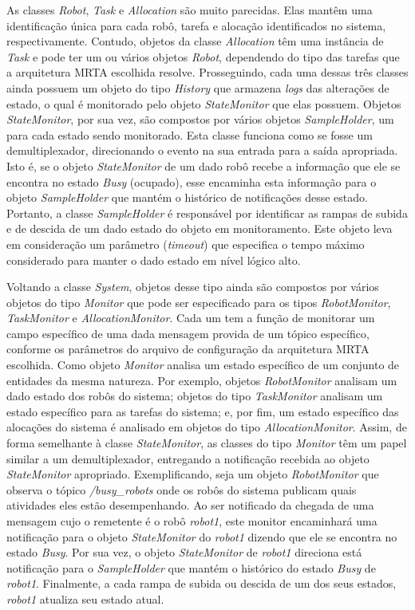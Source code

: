             As classes \textit{Robot}, \textit{Task} e \textit{Allocation} são muito parecidas. Elas mantêm uma identificação única para cada robô, tarefa e alocação identificados no sistema, respectivamente. Contudo, objetos da classe \textit{Allocation} têm uma instância de \textit{Task} e pode ter um ou vários objetos \textit{Robot}, dependendo do tipo das tarefas que a arquitetura MRTA escolhida resolve. Prosseguindo, cada uma dessas três classes ainda possuem um objeto do tipo \textit{History} que armazena \textit{logs} das alterações de estado, o qual é monitorado pelo objeto \textit{StateMonitor} que elas possuem. Objetos \textit{StateMonitor}, por sua vez, são compostos por vários objetos \textit{SampleHolder}, um para cada estado sendo monitorado. Esta classe funciona como se fosse um demultiplexador, direcionando o evento na sua entrada para a saída apropriada. Isto é, se o objeto \textit{StateMonitor} de um dado robô recebe a informação que ele se encontra no estado \textit{Busy} (ocupado), esse encaminha esta informação para o objeto \textit{SampleHolder} que mantém o histórico de notificações desse estado. Portanto, a classe \textit{SampleHolder} é responsável por identificar as rampas de subida e de descida de um dado estado do objeto em monitoramento. Este objeto leva em consideração um parâmetro (\textit{timeout}) que especifica o tempo máximo considerado para manter o dado estado em nível lógico alto.
            
            Voltando a classe \textit{System}, objetos desse tipo ainda são compostos por vários objetos do tipo \textit{Monitor} que pode ser especificado para os tipos \textit{RobotMonitor}, \textit{TaskMonitor} e \textit{AllocationMonitor}. Cada um tem a função de monitorar um campo específico de uma dada mensagem provida de um tópico específico, conforme os parâmetros do arquivo de configuração da arquitetura MRTA escolhida.  Como objeto \textit{Monitor} analisa um estado específico de um conjunto de entidades da mesma natureza. Por exemplo, objetos \textit{RobotMonitor} analisam um dado estado dos robôs do sistema; objetos do tipo \textit{TaskMonitor} analisam um estado específico para as tarefas do sistema; e, por fim, um estado específico das alocações do sistema é analisado em objetos do tipo \textit{AllocationMonitor}. Assim, de forma semelhante à classe \textit{StateMonitor}, as classes do tipo \textit{Monitor} têm um papel similar a um demultiplexador, entregando a notificação recebida ao objeto \textit{StateMonitor} apropriado. Exemplificando, seja um objeto \textit{RobotMonitor} que observa o tópico \textit{/busy\_robots} onde os robôs do sistema publicam quais atividades eles estão desempenhando. Ao ser notificado da chegada de uma mensagem cujo o remetente é o robô \textit{robot1}, este monitor encaminhará uma notificação para o objeto \textit{StateMonitor} do \textit{robot1} dizendo que ele se encontra no estado \textit{Busy}. Por sua vez, o objeto \textit{StateMonitor} de \textit{robot1} direciona está notificação para o \textit{SampleHolder} que mantém o histórico do estado \textit{Busy} de \textit{robot1}. Finalmente, a cada rampa de subida ou descida de um dos seus estados, \textit{robot1} atualiza seu estado atual.
        